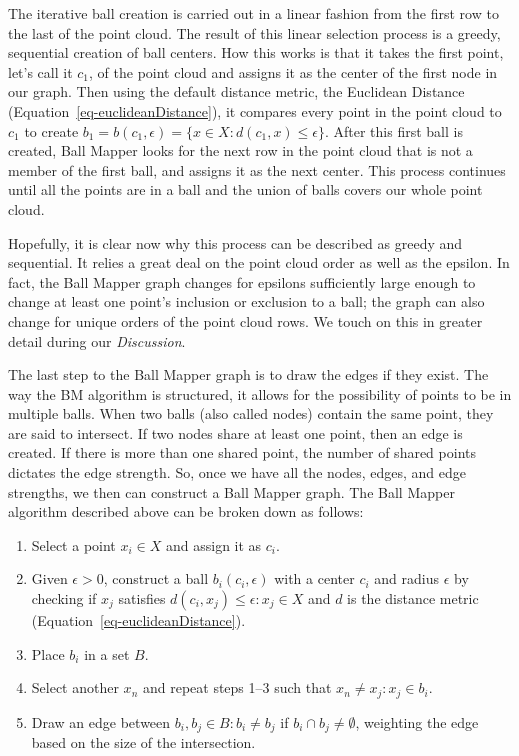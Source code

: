 \documentclass[10pt, letterpaper]{article}
\providecommand{\tightlist}{%
  \setlength{\itemsep}{0pt}\setlength{\parskip}{0pt}}
\begin{document}
The iterative ball creation is carried out in a linear fashion from the
first row to the last of the point cloud. The result of this linear
selection process is a greedy, sequential creation of ball centers. How
this works is that it takes the first point, let's call it \(c_1\), of
the point cloud and assigns it as the center of the first node in our
graph. Then using the default distance metric, the Euclidean Distance
(Equation~\ref{eq-euclideanDistance}), it compares every point in the
point cloud to \(c_1\) to create
\(b_1 = b(c_1, \epsilon) = \{x \in X : d(c_1, x) \leq \epsilon \}\).
After this first ball is created, Ball Mapper looks for the next row in
the point cloud that is not a member of the first ball, and assigns it
as the next center. This process continues until all the points are in a
ball and the union of balls covers our whole point cloud.

Hopefully, it is clear now why this process can be described as greedy
and sequential. It relies a great deal on the point cloud order as well
as the epsilon. In fact, the Ball Mapper graph changes for epsilons
sufficiently large enough to change at least one point's inclusion or
exclusion to a ball; the graph can also change for unique orders of the
point cloud rows. We touch on this in greater detail during our
\emph{Discussion}.

The last step to the Ball Mapper graph is to draw the edges if they
exist. The way the BM algorithm is structured, it allows for the
possibility of points to be in multiple balls. When two balls (also
called nodes) contain the same point, they are said to intersect. If two
nodes share at least one point, then an edge is created. If there is
more than one shared point, the number of shared points dictates the
edge strength. So, once we have all the nodes, edges, and edge
strengths, we then can construct a Ball Mapper graph. The Ball Mapper
algorithm described above can be broken down as follows:

\begin{enumerate}
\def\labelenumi{\arabic{enumi}.}
\tightlist
\item
  Select a point \(x_i \in X\) and assign it as \(c_i\).
\item
  Given \(\epsilon > 0\), construct a ball \(b_i(c_i, \epsilon)\) with a
  center \(c_i\) and radius \(\epsilon\) by checking if \(x_j\)
  satisfies \(d(c_i, x_j) \leq \epsilon : x_j \in X\) and \(d\) is the
  distance metric (Equation~\ref{eq-euclideanDistance}).
\item
  Place \(b_i\) in a set \(B\).
\item
  Select another \(x_n\) and repeat steps 1--3 such that
  \(x_n \neq x_j : x_j \in b_i\).
\item
  Draw an edge between \(b_i, b_j \in B : b_i \neq b_j\) if
  \(b_i \cap b_j \neq \emptyset\), weighting the edge based on the size
  of the intersection.
\end{enumerate}
\end{document}
